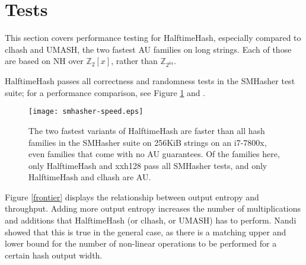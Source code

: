 \documentclass[runningheads]{llncs}
\newcommand{\ints}{\mathbb{Z}}
\begin{document}

\section{Tests}

This section covers performance testing for HalftimeHash, especially compared to clhash and UMASH, the two fastest AU families on long strings.
Each of those are based on NH over $\ints_2[x]$, rather than $\ints_{2^{64}}$.



HalftimeHash passes all correctness and randomness tests in the SMHasher test suite; for a performance comparison, see Figure \ref{smhasher-speed} and \cite{smhasher}.

\begin{figure}
  \texttt{[image: smhasher-speed.eps]}
\caption{
  \label{smhasher-speed}
    The two fastest variants of HalftimeHash are faster than all hash families in the SMHasher suite on 256KiB strings on an i7-7800x, even families that come with no AU guarantees. \protect\cite{smhasher}
    Of the families here, only HalftimeHash and xxh128 pass all SMHasher tests, and only HalftimeHash and clhash are AU.
}
\end{figure}

Figure \ref{frontier} displays the relationship between output entropy and throughput.
Adding more output entropy increases the number of multiplications and additions that HalftimeHash (or clhash, or UMASH) has to perform.
Nandi showed that this is true in the general case, as there is a matching upper and lower bound for the number of non-linear operations to be performed for a certain hash output width. \cite{ehc-nandi}
\end{document}
